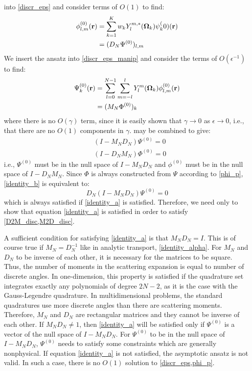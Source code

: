 into \cref{discr_eps} and consider terms of $O(1)$ to find:
\begin{equation}
\begin{split}
\phi_{l,m}^{(0)}(\br) &= \sum_{k=1}^K w_k Y_l^{m,*}(\bo_k) \psi_k^(0)(\br)\\ 
&= (D_N\Psi^{(0)})_{l,m}
\end{split}
\label{D2M_disc}
\end{equation}
We insert the ansatz into \cref{discr_eps_manip} and consider the terms
of $O(\epsilon^{-1})$ to find:
\begin{equation}
\begin{split}
\Psi_k^{(0)}(\br) &=\sum_{l=0}^{N-1} \sum_{m=-l}^l Y_l^m(\bo_k) 
\phi_{l,m}^{(0)}(\br)\\
&= (M_N\Phi^{(0)})_k
\end{split}
\label{M2D_disc}
\end{equation}
where there is no $O(\gamma)$ term, since it is easily shown that
$\gamma\rightarrow 0$ as $\epsilon\rightarrow 0$, i.e., that there are no
$O(1)$ components in $\gamma$.  may be combined to give:
\begin{align}
&(I-M_ND_N)\Psi^{(0)} = 0 \label{identity_a}\\
&(I-D_NM_N)\Phi^{(0)} = 0 \label{identity_b}
\end{align}
i.e., $\Psi^{(0)}$ must be in the null space of $I-M_N D_N$ and $\phi^{(0)}$
must be in the null space of $I-D_N M_N$. Since $\Phi$ is always constructed
from $\Psi$ according to \cref{phi_p}, \cref{identity_b}
is equivalent to:
\begin{equation}
D_N(I-M_N D_N)\Psi^{(0)} = 0
\end{equation}
which is always satisfied if \cref{identity_a} is satisfied.
Therefore, we need only to show that equation \cref{identity_a} is satisfied
in order to satisfy \cref{D2M_disc,M2D_disc}.

A sufficient condition for satisfying \cref{identity_a} is that $M_N D_N =I$.
This is of course true if $M_N=D_N^{-1}$ like in analytic transport,
\cref{identity_alpha}. For $M_N$ and $D_N$ to be inverse of each other, it is
necessary for the matrices to be square. Thus, the number of moments in the
scattering expansion is equal to number of discrete angles. In one-dimension,
this property is satisfied if the quadrature set integrates exactly any
polynomials of degree $2N-2$, as it is the case with the Gauss-Legendre
quadrature. In multidimensional problems, the standard quadratures use more
discrete angles than there are scattering moments. Therefore, $M_N$ and $D_N$
are rectangular matrices and they cannot be inverse of each other. If $M_N D_N
\neq 1$, then \cref{identity_a} will be satisfied only if $\Psi^{(0)}$ is a vector
of the null space of $I-M_N D_N$. For $\Psi^{(0)}$ to be in the null space of
$I-M_N D_N$, $\Psi^{(0)}$ needs to satisfy some constraints which are
generally nonphysical\cite{pautz_fp}. If equation \cref{identity_a} is not 
satisfied, the asymptotic ansatz is not valid. In such a case, there is no $O(1)$ 
solution to \cref{discr_eps,phi_p}. 


